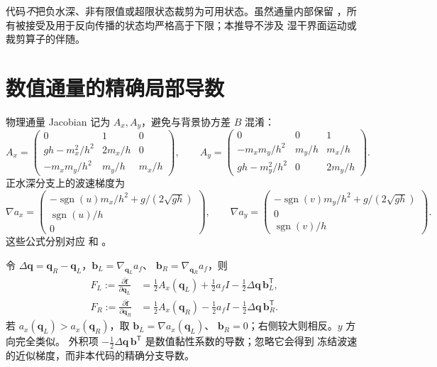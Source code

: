 \documentclass[12pt,a4paper]{article}
\newcommand{\q}{\mathbf{q}}
\newcommand{\trans}{^{\mathsf T}}
\begin{document}
代码\emph{不}把负水深、非有限值或超限状态裁剪为可用状态。虽然通量内部保留
，所有被接受及用于反向传播的状态均严格高于下限；本推导不涉及
湿干界面运动或裁剪算子的伴随。

\section{数值通量的精确局部导数}
\label{sec:dta-jacobian}

物理通量 Jacobian 记为 $A_x,A_y$，避免与背景协方差 $B$ 混淆：
\begin{equation}
 A_x=\begin{pmatrix}
 0&1&0\\
 gh-m_x^2/h^2&2m_x/h&0\\
 -m_xm_y/h^2&m_y/h&m_x/h
 \end{pmatrix},\qquad
 A_y=\begin{pmatrix}
 0&0&1\\
 -m_xm_y/h^2&m_y/h&m_x/h\\
 gh-m_y^2/h^2&0&2m_y/h
 \end{pmatrix}.
 \label{eq:dta-physical-jacobian}
\end{equation}
正水深分支上的波速梯度为
\begin{equation}
 \nabla a_x=\begin{pmatrix}
 -\operatorname{sgn}(u)m_x/h^2+g/(2\sqrt{gh})\\
 \operatorname{sgn}(u)/h\\0
 \end{pmatrix},\qquad
 \nabla a_y=\begin{pmatrix}
 -\operatorname{sgn}(v)m_y/h^2+g/(2\sqrt{gh})\\
 0\\\operatorname{sgn}(v)/h
 \end{pmatrix}.
 \label{eq:dta-speed-gradient}
\end{equation}
这些公式分别对应  和 。

令 $\Delta\q=\q_R-\q_L$，$\mathbf b_L=\nabla_{\q_L}a_f$、
$\mathbf b_R=\nabla_{\q_R}a_f$，则
\begin{align}
 F_L:=\frac{\partial\widehat{\mathbf f}}{\partial\q_L}
 &=\tfrac12 A_x(\q_L)+\tfrac12a_f I-\tfrac12\Delta\q\,\mathbf b_L\trans,\\
 F_R:=\frac{\partial\widehat{\mathbf f}}{\partial\q_R}
 &=\tfrac12 A_x(\q_R)-\tfrac12a_f I-\tfrac12\Delta\q\,\mathbf b_R\trans.
 \label{eq:dta-face-jacobian}
\end{align}
若 $a_x(\q_L)>a_x(\q_R)$，取 $\mathbf b_L=\nabla a_x(\q_L)$、
$\mathbf b_R=0$；右侧较大则相反。$y$ 方向完全类似。
外积项 $-\tfrac12\Delta\q\,\mathbf b\trans$ 是数值黏性系数的导数；忽略它会得到
冻结波速的近似梯度，而非本代码的精确分支导数。
\end{document}
